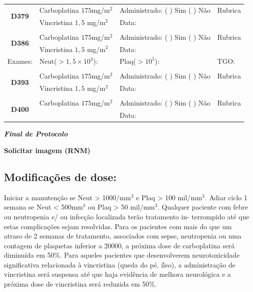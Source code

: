 \documentclass[11pt,a4paper,oldfontcommands]{memoir}
\begin{document}
\begin{center}
\begin{longtable}{p{1cm}p{4cm}|p{5cm}|p{3cm}}
    \hline
    \multicolumn{1}{c|}{\multirow{2}{*}{\textbf{D379}}}&{Carboplatina \(175\)mg/m\(^2\)}&{Administrado: (  ) Sim (  ) Não}&{Rubrica}\\
    \multicolumn{1}{c|}{}&{Vincristina \(1,5\) mg/m\(^2\)}&{Data:}&\\
    \hline
    \\
    \hline
    \multicolumn{1}{c|}{\multirow{2}{*}{\textbf{D386}}}&{Carboplatina \(175\)mg/m\(^2\)}&{Administrado: (  ) Sim (  ) Não}&{Rubrica}\\
    \multicolumn{1}{c|}{}&{Vincristina \(1,5\) mg/m\(^2\)}&{Data:}&\\
    \hline
    {\tiny{Exames:}}&{\tiny{Neut(\(>1,5\times10^3\)):}}&{\tiny{Plaq(\(>10^5\)):}}&{\tiny{TGO:}}
    \\
    \hline
    \\
    \hline
    \multicolumn{1}{c|}{\multirow{2}{*}{\textbf{D393}}}&{Carboplatina \(175\)mg/m\(^2\)}&{Administrado: (  ) Sim (  ) Não}&{Rubrica}\\
    \multicolumn{1}{c|}{}&{Vincristina \(1,5\) mg/m\(^2\)}&{Data:}&\\
    \hline
    \\
    \hline
    \multicolumn{1}{c|}{\multirow{2}{*}{\textbf{D400}}}&{Carboplatina \(175\)mg/m\(^2\)}&{Administrado: (  ) Sim (  ) Não}&{Rubrica}\\
	\multicolumn{1}{c|}{}&&{Data:}&\\
    \hline
\end{longtable}

\textbf{\textit{Final de Protocolo}}

\textbf{Solicitar imagem (RNM)}

\end{center}

\subsection{Modificações de dose:}
Iniciar a manutenção se Neut > 1000/mm\(^3\) e Plaq > 100 mil/mm\(^3\). Adiar ciclo 1 semana se Neut < 500mm\(^3\) ou Plaq > 50 mil/mm\(^3\). Qualquer paciente com febre ou neutropenia e/ ou infecção localizada terão tratamento in- terrompido até que estas complicações sejam resolvidas. Para os pacientes com mais do que um atraso de 2 semanas de tratamento, associados com sepse, neutropenia ou uma contagem de plaquetas inferior a 20000, a próxima dose de carboplatina será diminuída em 50\%. Para aqueles pacientes que desenvolverem neurotoxicidade significativa relacionada à vincristina  (queda do pé, íleo), a administração de vincristina será suspensa até que haja evidência de melhora neurológica e a próxima dose de vincristina será reduzida em 50\%.
\end{document}
